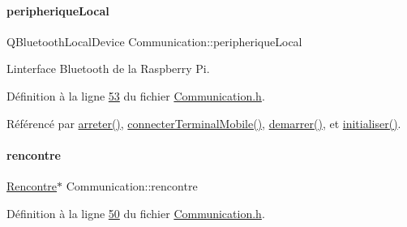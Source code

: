 \mbox{\label{class_communication_a2d643d199169dfe1d258df54d3ee5728}} 
\paragraph{\texorpdfstring{peripherique\+Local}{peripheriqueLocal}}
{\footnotesize\ttfamily Q\+Bluetooth\+Local\+Device Communication\+::peripherique\+Local\hspace{0.3cm}{\ttfamily [private]}}



L\textquotesingle{}interface Bluetooth de la Raspberry Pi. 



Définition à la ligne \hyperlink{_communication_8h_source_l00053}{53} du fichier \hyperlink{_communication_8h_source}{Communication.\+h}.



Référencé par \hyperlink{_communication_8cpp_source_l00099}{arreter()}, \hyperlink{_communication_8cpp_source_l00147}{connecter\+Terminal\+Mobile()}, \hyperlink{_communication_8cpp_source_l00073}{demarrer()}, et \hyperlink{_communication_8cpp_source_l00044}{initialiser()}.

\mbox{\label{class_communication_acb471e5da168acc149c5e4e90d8b601c}} 
\paragraph{\texorpdfstring{rencontre}{rencontre}}
{\footnotesize\ttfamily \hyperlink{class_rencontre}{Rencontre}$\ast$ Communication\+::rencontre\hspace{0.3cm}{\ttfamily [private]}}



Définition à la ligne \hyperlink{_communication_8h_source_l00050}{50} du fichier \hyperlink{_communication_8h_source}{Communication.\+h}.

\mbox{\label{class_communication_a6384747297d6efa9e8fd2fc79ed0c269}} 

